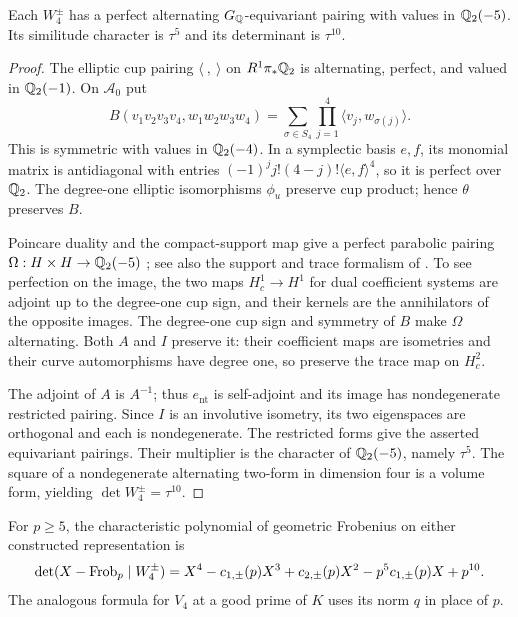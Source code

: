 \begin{proposition}\label{prop:descent-pairing}
Each $W_4^\pm$ has a perfect alternating $G_\mathbb Q$-equivariant pairing
with values in $\mathbb Q_2(-5)$. Its similitude character is $\tau^5$ and
its determinant is $\tau^{10}$.
\end{proposition}

\begin{proof}
The elliptic cup pairing $\langle\ ,\ \rangle$ on $R^1\pi_*\mathbb Q_2$
is alternating, perfect, and valued in $\mathbb Q_2(-1)$. On $\mathcal A_0$ put
\[
 B(v_1v_2v_3v_4,w_1w_2w_3w_4)
   =\sum_{\sigma\in S_4}\prod_{j=1}^4\langle v_j,w_{\sigma(j)}\rangle.
\]
This is symmetric with values in $\mathbb Q_2(-4)$. In a symplectic basis
$e,f$, its monomial matrix is antidiagonal with entries
$(-1)^j j!(4-j)!\langle e,f\rangle^4$, so it is perfect over $\mathbb Q_2$.
The degree-one elliptic isomorphisms $\phi_u$ preserve cup product;
hence $\theta$ preserves $B$.

Poincare duality and the compact-support map give a perfect parabolic
pairing $\Omega:H\times H\to\mathbb Q_2(-5)$
\cite[Theorem 24.1]{Milne}; see also the support and trace formalism
of \cite{SGA4}. To see perfection on the image, the two maps
$H_c^1\to H^1$ for dual coefficient systems are adjoint up to the
degree-one cup sign, and their kernels are the annihilators of the opposite
images. The degree-one cup sign and symmetry of $B$ make $\Omega$
alternating. Both $A$ and $I$ preserve it: their coefficient maps
are isometries and their curve automorphisms have degree one, so
preserve the trace map on $H_c^2$.

The adjoint of $A$ is $A^{-1}$; thus $e_{\mathrm{nt}}$ is self-adjoint
and its image has nondegenerate restricted pairing. Since $I$ is an
involutive isometry, its two eigenspaces are orthogonal and each is
nondegenerate. The restricted forms give the asserted equivariant
pairings. Their multiplier is the character of $\mathbb Q_2(-5)$, namely
$\tau^5$. The square of a nondegenerate alternating two-form in
dimension four is a volume form, yielding $\det W_4^\pm=\tau^{10}$.
\end{proof}

\begin{corollary}\label{cor:descent-reciprocity}
For $p\ge5$, the characteristic polynomial of geometric Frobenius
on either constructed representation is
\[
 \det(X-\operatorname{Frob}_p\mid W_4^\pm)
   =X^4-c_{1,\pm}(p)X^3+c_{2,\pm}(p)X^2
       -p^5c_{1,\pm}(p)X+p^{10}.
\]
The analogous formula for $V_4$ at a good prime of $K$ uses its norm
$q$ in place of $p$.
\end{corollary}

